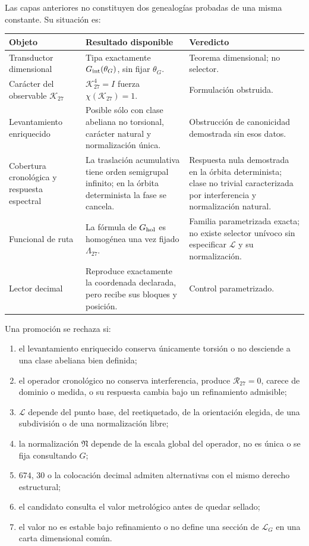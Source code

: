 Las capas anteriores no constituyen dos genealogías probadas de una misma
constante. Su situación es:
\begin{center}
\begin{tabularx}{0.96\textwidth}{@{}L{0.25\textwidth}Y L{0.26\textwidth}@{}}
\toprule
Objeto & Resultado disponible & Veredicto\\
\midrule
Transductor dimensional &
Tipa exactamente \(G_{\rm int}(\theta_G)\), sin fijar \(\theta_G\). &
Teorema dimensional; no selector.\\
Carácter del observable \(\mathcal K_{27}\) &
\(\mathcal K_{27}^4=I\) fuerza
\(\chi(\mathcal K_{27})=1\). &
Formulación obstruida.\\
Levantamiento enriquecido &
Posible sólo con clase abeliana no torsional, carácter natural y
normalización única. &
Obstrucción de canonicidad demostrada sin esos datos.\\
Cobertura cronológica y respuesta espectral &
La traslación acumulativa tiene orden semigrupal infinito; en la órbita
determinista la fase se cancela. &
Respuesta nula demostrada en la órbita determinista; clase no trivial
caracterizada por interferencia y normalización natural.\\
Funcional de ruta &
La fórmula de \(G_{\rm hol}\) es homogénea una vez fijado
\(\Lambda_{27}\). &
Familia parametrizada exacta; no existe selector unívoco sin especificar
\(\mathscr L\) y su normalización.\\
Lector decimal &
Reproduce exactamente la coordenada declarada, pero recibe sus bloques y
posición. &
Control parametrizado.\\
\bottomrule
\end{tabularx}
\end{center}

\begin{criterion}
\label{crit:selector-G}
Una promoción se rechaza si:
\begin{enumerate}
 \item el levantamiento enriquecido conserva únicamente torsión o no desciende
 a una clase abeliana bien definida;
 \item el operador cronológico no conserva interferencia, produce
 \(\mathcal R_{27}=0\), carece de dominio o medida, o su respuesta cambia bajo
 un refinamiento admisible;
 \item \(\mathscr L\) depende del punto base, del reetiquetado, de la
 orientación elegida, de una subdivisión o de una normalización libre;
 \item la normalización \(\mathfrak N\) depende de la escala global del
 operador, no es única o se fija consultando \(G\);
 \item \(674\), \(30\) o la colocación decimal admiten alternativas con el
 mismo derecho estructural;
 \item el candidato consulta el valor metrológico antes de quedar sellado;
 \item el valor no es estable bajo refinamiento o no define una sección de
 \(\mathcal L_G\) en una carta dimensional común.
\end{enumerate}
\end{criterion}

